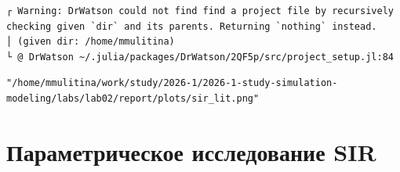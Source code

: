 \documentclass[
  english,
  russian,
  12pt,
  a4paper,
  DIV=11,
  numbers=noendperiod]{scrartcl}
\begin{document}
\begin{verbatim}
┌ Warning: DrWatson could not find find a project file by recursively checking given `dir` and its parents. Returning `nothing` instead.
│ (given dir: /home/mmulitina)
└ @ DrWatson ~/.julia/packages/DrWatson/2QF5p/src/project_setup.jl:84
\end{verbatim}

\begin{verbatim}
"/home/mmulitina/work/study/2026-1/2026-1-study-simulation-modeling/labs/lab02/report/plots/sir_lit.png"
\end{verbatim}

\section{Параметрическое исследование
SIR}\label{ux43fux430ux440ux430ux43cux435ux442ux440ux438ux447ux435ux441ux43aux43eux435-ux438ux441ux441ux43bux435ux434ux43eux432ux430ux43dux438ux435-sir}
\end{document}

